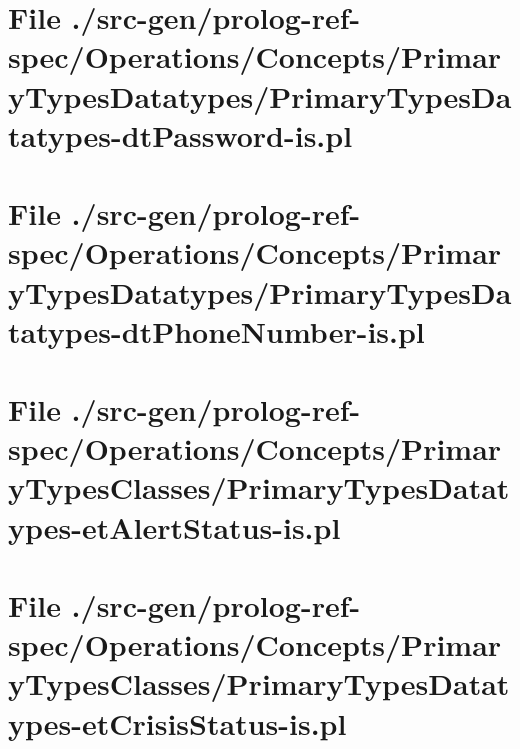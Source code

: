 \section[File /src-gen/prolog-ref-spec.../PrimaryTypesDatatypes-dtPassword-is.pl]{File ./src-gen/prolog-ref-spec/Operations/Concepts/PrimaryTypesDatatypes/PrimaryTypesDatatypes-dtPassword-is.pl}
\scriptsize

\normalsize
	
\section[File /src-gen/prolog-ref-spec.../PrimaryTypesDatatypes-dtPhoneNumber-is.pl]{File ./src-gen/prolog-ref-spec/Operations/Concepts/PrimaryTypesDatatypes/PrimaryTypesDatatypes-dtPhoneNumber-is.pl}
\scriptsize

\normalsize
	
\section[File /src-gen/prolog-ref-spec.../PrimaryTypesDatatypes-etAlertStatus-is.pl]{File ./src-gen/prolog-ref-spec/Operations/Concepts/PrimaryTypesClasses/PrimaryTypesDatatypes-etAlertStatus-is.pl}
\scriptsize

\normalsize
	
\section[File /src-gen/prolog-ref-spec.../PrimaryTypesDatatypes-etCrisisStatus-is.pl]{File ./src-gen/prolog-ref-spec/Operations/Concepts/PrimaryTypesClasses/PrimaryTypesDatatypes-etCrisisStatus-is.pl}
\scriptsize

\normalsize
	
